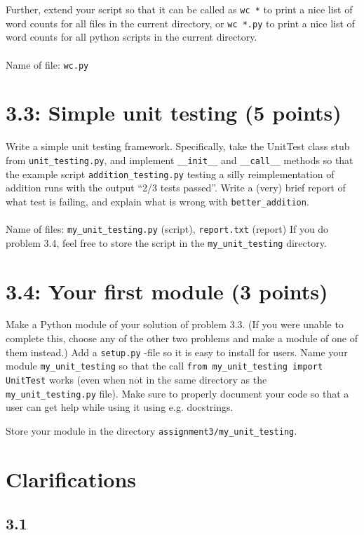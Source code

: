 \documentclass[english]{article}
\begin{document}
Further, extend your script so that it can be called as \texttt{wc *} to print a nice list of word counts for all files in the current directory, or \texttt{wc *.py} to print a nice list of word counts for all python scripts in the current directory.
\\ \\
Name of file: \texttt{wc.py}

\section{3.3: Simple unit testing (5 points)}
Write a simple unit testing framework. Specifically, take the UnitTest class stub from \texttt{unit\_testing.py}, and implement \texttt{\_\_init\_\_} and \texttt{\_\_call\_\_} methods so that the example script \texttt{addition\_testing.py} testing a silly reimplementation of addition runs with the output ``2/3 tests passed''. Write a (very) brief report of what test is failing, and explain what is wrong with \texttt{better\_addition}.
\\ \\
Name of files: \texttt{my\_unit\_testing.py} (script), \texttt{report.txt} (report) If you do problem 3.4, feel free to store the script in the \texttt{my\_unit\_testing} directory.

\section{3.4: Your first module (3 points)}
Make a Python module of your solution of problem 3.3. (If you were unable to complete this, choose any of the other two problems and make a module of one of them instead.) Add a \texttt{setup.py} -file so it is easy to install for users. Name your module \texttt{my\_unit\_testing} so that the call \texttt{from my\_unit\_testing import UnitTest} works (even when not in the same directory as the \texttt{my\_unit\_testing.py} file). Make sure to properly document your code so that a user can get help while using it using e.g. docstrings.

Store your module in the directory \texttt{assignment3/my\_unit\_testing}.
 
\newpage

\section{Clarifications}

\subsection{3.1}
\end{document}
